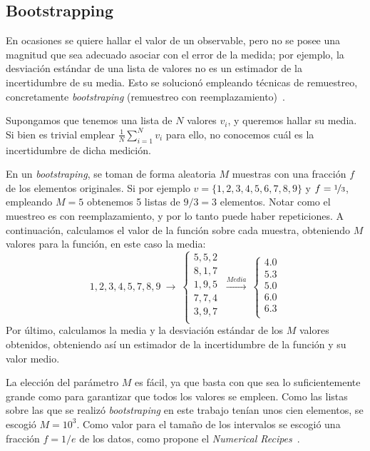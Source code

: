 \documentclass[11pt]{report}
\begin{document}
\begin{appendices}


\chapter{Bootstrapping}
\label{chap:bootstrap}
En ocasiones se quiere hallar el valor de un observable, pero no se
posee una magnitud que sea adecuado asociar con el error de la medida;
por ejemplo, la desviación estándar de una lista de valores no es un
estimador de la incertidumbre de su media. Esto se solucionó empleando
técnicas de remuestreo, concretamente
\textit{bootstraping} (remuestreo con reemplazamiento)~\cite{boot}.

Supongamos que tenemos una lista de $N$ valores $v_i$, y queremos hallar su
media. Si bien es trivial emplear $\frac{1}{N} \sum_{i=1}^N v_i$ para
ello, no conocemos cuál es la incertidumbre de dicha medición.

En un \textit{bootstraping}, se toman de forma aleatoria $M$
muestras con una fracción $f$ de los elementos originales. Si por
ejemplo $v = \{1,2,3,4,5,6,7,8,9\}$ y $f=\nicefrac{1}{3}$, empleando
$M=5$ obtenemos 5 listas de $9/3=3$ elementos.
Notar como el muestreo es con reemplazamiento, y por lo tanto puede
haber repeticiones. A continuación, calculamos el valor de la función
sobre cada muestra, obteniendo $M$ valores para la función, en este
caso la media:
\begin{equation*}
  1,2,3,4,5,7,8,9 \ \rightarrow \
  \begin{cases}
    5,5,2 \\
    8,1,7 \\
    1,9,5 \\
    7,7,4 \\
    3,9,7 \\
  \end{cases}
  \ \stackrel{\mathit{Media}}{→} \
  \begin{cases}
    4.0 \\
    5.3 \\
    5.0 \\
    6.0 \\
    6.3 \\
  \end{cases}
\end{equation*}
Por último, calculamos la media y la desviación estándar de los $M$
valores obtenidos, obteniendo así un estimador de la incertidumbre de
la función y su valor medio.

La elección del parámetro $M$ es fácil, ya que basta con que sea lo
suficientemente grande como para garantizar que todos los valores se
empleen. Como las listas sobre las que se realizó
\textit{bootstraping} en este trabajo tenían unos cien elementos, se
escogió $M=10^3$.
Como valor para el tamaño de los intervalos se
escogió una fracción $f = 1/e$ de los datos, como propone el
\textit{Numerical Recipes}~\cite{numericalrecipes}.


\end{appendices}
\end{document}
